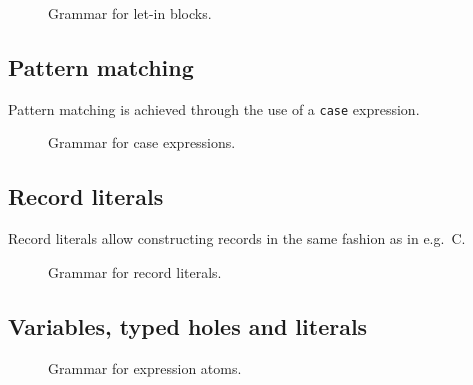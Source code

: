 \begin{figure}[H]
	\centering


	\caption{Grammar for let-in blocks.}
	\label{fig:zilch-grammar-expressions-letin-grammar}
\end{figure}

\subsection{Pattern matching}\label{subsec:zilch-grammar-expressions-case}

Pattern matching is achieved through the use of a \texttt{case} expression.

\begin{figure}[H]
	\centering


	\caption{Grammar for case expressions.}
	\label{fig:zilch-gramma-expressions-case-grammar}
\end{figure}

\subsection{Record literals}\label{subsec:zilch-grammar-expressions-record}

Record literals allow constructing records in the same fashion as in e.g.\ C.

\begin{figure}[H]
	\centering


	\caption{Grammar for record literals.}
	\label{fig:zilch-gramma-expressions-record-grammar}
\end{figure}

\subsection{Variables, typed holes and literals}\label{subsec:zilch-grammar-expressions-basicexpr}

\begin{figure}[H]
	\centering


	\caption{Grammar for expression atoms.}
	\label{fig:zilch-grammar-expressions-atom-grammar}
\end{figure}

